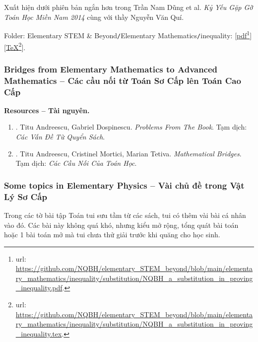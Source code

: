 \documentclass[12pt]{article}
\begin{document}
\begin{enumerate}
\begin{itemize}
		Xuất hiện dưới phiên bản ngắn hơn trong {\sc Trần Nam Dũng} et al. {\it Kỷ Yếu Gặp Gỡ Toán Học Miền Nam 2014} cùng với thầy {\sc Nguyễn Văn Quí}.
		
		Folder: {\sf Elementary STEM \& Beyond{\tt/}Elementary Mathematics{\tt/}inequality}: [\href{https://github.com/NQBH/elementary_STEM_beyond/blob/main/elementary_mathematics/inequality/substitution/NQBH_a_substitution_in_proving_inequality.pdf}{pdf}\footnote{{\sc url}: \url{https://github.com/NQBH/elementary_STEM_beyond/blob/main/elementary_mathematics/inequality/substitution/NQBH_a_substitution_in_proving_inequality.pdf}.}][\href{https://github.com/NQBH/elementary_STEM_beyond/blob/main/elementary_mathematics/inequality/substitution/NQBH_a_substitution_in_proving_inequality.tex}{\TeX}\footnote{{\sc url}: \url{https://github.com/NQBH/elementary_STEM_beyond/blob/main/elementary_mathematics/inequality/substitution/NQBH_a_substitution_in_proving_inequality.tex}.}].
	\end{itemize}
\end{enumerate}

\subsubsection{Bridges from Elementary Mathematics to Advanced Mathematics -- Các cầu nối từ Toán Sơ Cấp lên Toán Cao Cấp}
\textbf{\textsf{Resources -- Tài nguyên.}}
\begin{enumerate}
	\item \cite{Andreescu_Dospinescu2010}. {\sc Titu Andreescu, Gabriel Dospinescu}. {\it Problems From The Book}. {\sf Tạm dịch}: {\it Các Vấn Đề Từ Quyển Sách}.
	\item \cite{Andreescu_Mortici_Tetiva2017}. {\sc Titu Andreescu, Cristinel Mortici, Marian Tetiva}. {\it Mathematical Bridges}. {\sf Tạm dịch}: {\it Các Cầu Nối Của Toán Học}.
\end{enumerate}


\subsubsection{Some topics in Elementary Physics -- Vài chủ đề trong Vật Lý Sơ Cấp}
Trong các tờ bài tập Toán tui sưu tầm từ các sách, tui có thêm vài bài cá nhân vào đó. Các bài này không quá khó, nhưng kiểu mở rộng, tổng quát bài toán hoặc 1 bài toán mở mà tui chưa thử giải trước khi quăng cho học sinh.
\end{document}
